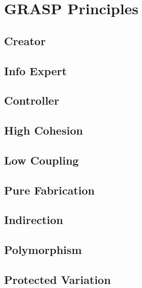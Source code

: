 \section{GRASP Principles}
\subsection{Creator}
\subsection{Info Expert}
\subsection{Controller}
\subsection{High Cohesion}
\subsection{Low Coupling}
\subsection{Pure Fabrication}
\subsection{Indirection}
\subsection{Polymorphism}
\subsection{Protected Variation}
